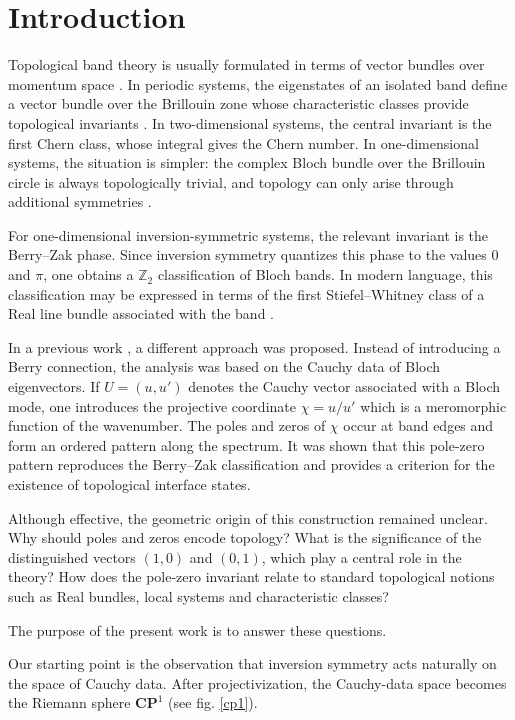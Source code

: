 \documentclass[preprint,12pt]{elsarticle}
\begin{document}
\section{Introduction}

Topological band theory is usually formulated in terms of vector bundles over momentum space \cite{topophot,colloquium,simon,zak,thouless}. In periodic systems, the eigenstates of an isolated band define a vector bundle over the Brillouin zone whose characteristic classes provide topological invariants \cite{milnor,nakahara,nash}. In two-dimensional systems, the central invariant is the first Chern class, whose integral gives the Chern number. In one-dimensional systems, the situation is simpler: the complex Bloch bundle over the Brillouin circle is always topologically trivial, and topology can only arise through additional symmetries \cite{kohn,zak,Chan2014,FelbacqAnnalen}.

For one-dimensional inversion-symmetric systems, the relevant invariant is the Berry--Zak phase. Since inversion symmetry quantizes this phase to the values $0$ and $\pi$, one obtains a $\mathbb Z_2$ classification of Bloch bands. In modern language, this classification may be expressed in terms of the first Stiefel--Whitney class of a Real line bundle associated with the band \cite{zirnbauer,atiyah,gomi}.

In a previous work \cite{FelbacqAnnalen}, a different approach was proposed. Instead of introducing a Berry connection, the analysis was based on the Cauchy data of Bloch eigenvectors. If $U=(u,u')$ denotes the Cauchy vector associated with a Bloch mode, one introduces the projective coordinate $\chi=u/u'$ which is a meromorphic function of the wavenumber. The poles and zeros of $\chi$ occur at band edges and form an ordered pattern along the spectrum. It was shown that this pole-zero pattern reproduces the Berry--Zak classification and provides a criterion for the existence of topological interface states.

Although effective, the geometric origin of this construction remained unclear. Why should poles and zeros encode topology? What is the significance of the distinguished vectors $(1,0)$ and $(0,1)$, which play a central role in the theory? How does the pole-zero invariant relate to standard topological notions such as Real bundles, local systems and characteristic classes?

The purpose of the present work is to answer these questions.

Our starting point is the observation that inversion symmetry acts naturally on the space of Cauchy data. After projectivization, the Cauchy-data space becomes the Riemann sphere $\mathbf{CP}^1$ (see fig. \ref{cp1}).
\end{document}
